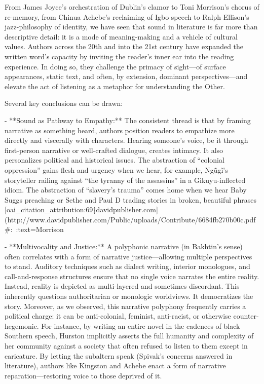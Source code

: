 \documentclass[12pt]{report}
\begin{document}
From James Joyce’s orchestration of Dublin’s clamor to Toni Morrison’s chorus of re-memory, from Chinua Achebe’s reclaiming of Igbo speech to Ralph Ellison’s jazz-philosophy of identity, we have seen that sound in literature is far more than descriptive detail: it is a mode of meaning-making and a vehicle of cultural values. Authors across the 20th and into the 21st century have expanded the written word’s capacity by inviting the reader’s inner ear into the reading experience. In doing so, they challenge the primacy of sight—of surface appearances, static text, and often, by extension, dominant perspectives—and elevate the act of listening as a metaphor for understanding the Other.

Several key conclusions can be drawn:

- **Sound as Pathway to Empathy:** The consistent thread is that by framing narrative as something heard, authors position readers to empathize more directly and viscerally with characters. Hearing someone’s voice, be it through first-person narrative or well-crafted dialogue, creates intimacy. It also personalizes political and historical issues. The abstraction of “colonial oppression” gains flesh and urgency when we hear, for example, Ngũgĩ’s storyteller railing against “the tyranny of the assassins” in a Gikuyu-inflected idiom. The abstraction of “slavery’s trauma” comes home when we hear Baby Suggs preaching or Sethe and Paul D trading stories in broken, beautiful phrases [oai_citation_attribution:69‡davidpublisher.com](http://www.davidpublisher.com/Public/uploads/Contribute/6684fb270b00c.pdf#:~:text=Morrison%

- **Multivocality and Justice:** A polyphonic narrative (in Bakhtin’s sense) often correlates with a form of narrative justice—allowing multiple perspectives to stand. Auditory techniques such as dialect writing, interior monologues, and call-and-response structures ensure that no single voice narrates the entire reality. Instead, reality is depicted as multi-layered and sometimes discordant. This inherently questions authoritarian or monologic worldviews. It democratizes the story. Moreover, as we observed, this narrative polyphony frequently carries a political charge: it can be anti-colonial, feminist, anti-racist, or otherwise counter-hegemonic. For instance, by writing an entire novel in the cadences of black Southern speech, Hurston implicitly asserts the full humanity and complexity of her community against a society that often refused to listen to them except in caricature. By letting the subaltern speak (Spivak’s concerns answered in literature), authors like Kingston and Achebe enact a form of narrative reparation—restoring voice to those deprived of it.
\end{document}
